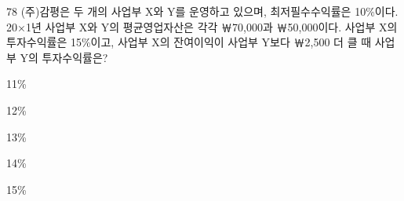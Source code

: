 \begin{question}{78}
(주)감평은 두 개의 사업부 X와 Y를 운영하고 있으며, 최저필수수익률은 10\%이다. 20×1년 사업부 X와 Y의 평균영업자산은 각각 ￦70,000과 ￦50,000이다. 사업부 X의 투자수익률은 15\%이고, 사업부 X의 잔여이익이 사업부 Y보다 ￦2,500 더 클 때 사업부 Y의 투자수익률은?
\begin{choices}
  \item 11\%
  \item 12\%
  \item 13\%
  \item 14\%
  \item 15\%
\end{choices}
\end{question}
